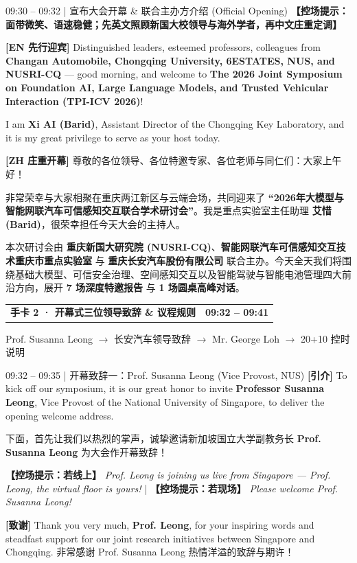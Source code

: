 \documentclass[12pt,a4paper]{article}
\makeatletter
\newcommand{\cardbanner}[3]{%
  \begin{tcolorbox}[
    enhanced, colback=nusnavy, colframe=nusnavy, arc=1.8mm,
    boxrule=0pt, left=3.8mm, right=3.8mm, top=2.1mm, bottom=2.2mm,
    before skip=0pt, after skip=2.4mm,
    borderline south={1.1mm}{0mm}{nusorange}
  ]
    \begin{tabularx}{\linewidth}{@{}X r@{}}
      {\fontsize{13.2}{16}\selectfont\color{white}\textbf{#1}} &
      {\fontsize{11.2}{14}\selectfont\color{orangebg}\textbf{#2}}
    \end{tabularx}
    \vspace{0.6mm}
    {\fontsize{9.3}{11.8}\selectfont\color{slate200}#3}
  \end{tcolorbox}
}
\newcommand{\cue}[1]{%
  {\fontsize{9.6}{12.5}\selectfont\textcolor{nusorange}{\textbf{【控场提示：#1】}}}%
}
\makeatother
\begin{document}
\begin{scriptbox}{09:30 – 09:32 \;|\; 宣布大会开幕 \& 联合主办方介绍 (Official Opening)}
\fontsize{11.8}{17.4}\selectfont
\cue{面带微笑、语速稳健；先英文照顾新国大校领导与海外学者，再中文庄重定调}\par
\vspace{0.8mm}
\textbf{[EN 先行迎宾]} Distinguished leaders, esteemed professors, colleagues from \textbf{Changan Automobile, Chongqing University, 6ESTATES, NUS, and NUSRI-CQ} — good morning, and welcome to \textbf{The 2026 Joint Symposium on Foundation AI, Large Language Models, and Trusted Vehicular Interaction (TPI-ICV 2026)}!\par
I am \textbf{Xi AI (Barid)}, Assistant Director of the Chongqing Key Laboratory, and it is my great privilege to serve as your host today.\par
\vspace{1.4mm}
\textbf{[ZH 庄重开幕]} 尊敬的各位领导、各位特邀专家、各位老师与同仁们：大家上午好！\par
非常荣幸与大家相聚在重庆两江新区与云端会场，共同迎来了 \textbf{“2026年大模型与智能网联汽车可信感知交互联合学术研讨会”}。我是重点实验室主任助理 \textbf{艾惜 (Barid)}，很荣幸担任今天大会的主持人。\par
本次研讨会由 \textbf{重庆新国大研究院 (NUSRI-CQ)}、\textbf{智能网联汽车可信感知交互技术重庆市重点实验室} 与 \textbf{重庆长安汽车股份有限公司} 联合主办。今天全天我们将围绕基础大模型、可信安全治理、空间感知交互以及智能驾驶与智能电池管理四大前沿方向，展开 \textbf{7 场深度特邀报告} 与 \textbf{1 场圆桌高峰对话}。
\end{scriptbox}

\newpage

\cardbanner{手卡 2 · 开幕式三位领导致辞 \& 议程规则}{09:32 – 09:41}{Prof. Susanna Leong $\rightarrow$ 长安汽车领导致辞 $\rightarrow$ Mr. George Loh $\rightarrow$ 20+10 控时说明}

\begin{scriptbox}{09:32 – 09:35 \;|\; 开幕致辞一：Prof. Susanna Leong (Vice Provost, NUS)}
\fontsize{11.6}{16.8}\selectfont
\textbf{[引介]} To kick off our symposium, it is our great honor to invite \textbf{Professor Susanna Leong}, Vice Provost of the National University of Singapore, to deliver the opening welcome address.\par
下面，首先让我们以热烈的掌声，诚挚邀请新加坡国立大学副教务长 \textbf{Prof. Susanna Leong} 为大会作开幕致辞！\par
\cue{若线上} \textit{Prof. Leong is joining us live from Singapore — Prof. Leong, the virtual floor is yours!} \;|\; \cue{若现场} \textit{Please welcome Prof. Susanna Leong!}\par
\vspace{1mm}
\textbf{[致谢]} Thank you very much, \textbf{Prof. Leong}, for your inspiring words and steadfast support for our joint research initiatives between Singapore and Chongqing. 非常感谢 Prof. Susanna Leong 热情洋溢的致辞与期许！
\end{scriptbox}
\end{document}
